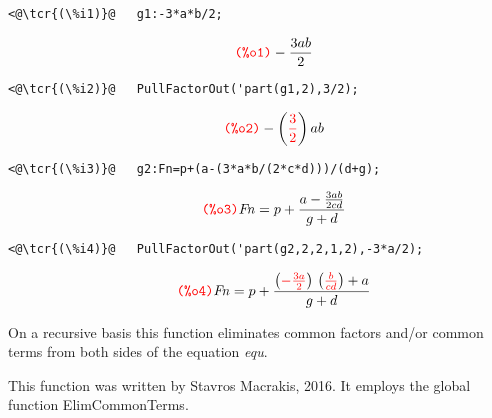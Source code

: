 \documentclass[../Maxima_Workbook.tex]{subfiles}
\begin{document}
\lz \begin{small}
\color{blue} \leqn
\begin{lstlisting}
<@\tcr{(\%i1)}@   g1:-3*a*b/2;
\end{lstlisting}
\vspace{-5mm} \[\tag*{\tcr{\ttfamily (\%o1)}} -\frac{3 a b}{2} \]
\vspace{-6mm} 
\begin{lstlisting}
<@\tcr{(\%i2)}@   PullFactorOut('part(g1,2),3/2);
\end{lstlisting}
\vspace{-5mm} \[\tag*{\tcr{\ttfamily (\%o2)}} -\left( \tcr{\frac{3}{2}} \right)  a b \]
\vspace{-6mm} 
\begin{lstlisting}
<@\tcr{(\%i3)}@   g2:Fn=p+(a-(3*a*b/(2*c*d)))/(d+g);
\end{lstlisting}
\vspace{-5mm} \[\tag*{\tcr{\ttfamily (\%o3)}} \mathit{Fn}=p+\frac{a-\frac{3 a b}{2 c d}}{g+d} \]
\vspace{-6mm} 
\begin{lstlisting}
<@\tcr{(\%i4)}@   PullFactorOut('part(g2,2,2,1,2),-3*a/2);
\end{lstlisting}
\vspace{-5mm} \[\tag*{\tcr{\ttfamily (\%o4)}} \mathit{Fn}=p+\frac{\left( \tcr{-\frac{3 a}{2}} \right) \, \left( \tcr{\frac{b}{c d}} \right) +a}{g+d} \]
\vspace{-2mm} 
\color{black} \reqn
\end{small}

\lzz {} \hfill {}

\lz On a recursive basis this function eliminates common factors and/or common terms from both sides of the equation \emph{equ}.

\lz This function was written by Stavros Macrakis, 2016. It employs the global function ElimCommonTerms.
\end{document}
